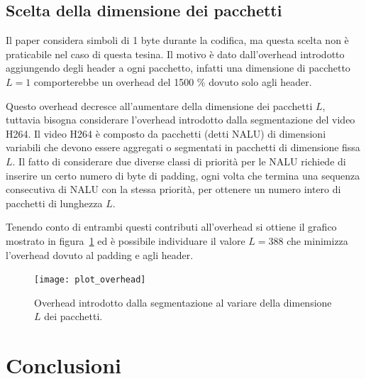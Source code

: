\documentclass[italian, a4paper, 12pt]{article}
\begin{document}
\subsection{Scelta della dimensione dei pacchetti}
\label{sec:pktsize}
Il paper \cite{uep} considera simboli di 1 byte durante la codifica,
ma questa scelta non è praticabile nel caso di questa tesina. Il
motivo è dato dall'overhead introdotto aggiungendo degli header a ogni
pacchetto, infatti una dimensione di pacchetto $L=1$ comporterebbe un
overhead del 1500 \% dovuto solo agli header.

Questo overhead decresce all'aumentare della dimensione dei pacchetti
$L$, tuttavia bisogna considerare l'overhead introdotto dalla
segmentazione del video H264.
%
Il video H264 è composto da pacchetti (detti NALU) di dimensioni
variabili che devono essere aggregati o segmentati in pacchetti di
dimensione fissa $L$. Il fatto di considerare due diverse classi di
priorità per le NALU richiede di inserire un certo numero di byte di
padding, ogni volta che termina una sequenza consecutiva di NALU con
la stessa priorità, per ottenere un numero intero di pacchetti di
lunghezza $L$.

Tenendo conto di entrambi questi contributi all'overhead si ottiene il
grafico mostrato in figura~\ref{fig:pktsize} ed è possibile
individuare il valore $L = 388$ che minimizza l'overhead dovuto al
padding e agli header.
\begin{figure}[H]
  \centering
  \texttt{[image: plot\_overhead]}
  \caption{Overhead introdotto dalla segmentazione al variare della
    dimensione $L$ dei pacchetti.}
  \label{fig:pktsize}
\end{figure}

\newpage
\section{Conclusioni} %



\printbibliography[heading=bibnumbered, title=Bibliografia]
\end{document}
